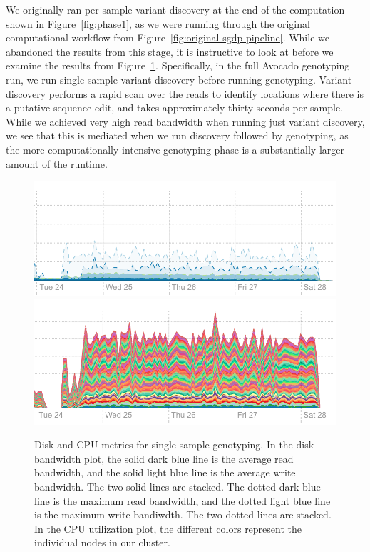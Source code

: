 \documentclass[phd]{ucbthesis}
\begin{document}
We originally ran per-sample variant discovery at the end of the computation
shown in Figure~\ref{fig:phase1}, as we were running through the original
computational workflow from Figure~\ref{fig:original-sgdp-pipeline}. While we
abandoned the results from this stage, it is instructive to look at before we
examine the results from Figure~\ref{fig:phase2}. Specifically, in the full
Avocado genotyping run, we run single-sample variant discovery before running
genotyping. Variant discovery performs a rapid scan over the reads to identify
locations where there is a putative sequence edit, and takes approximately
thirty seconds per sample. While we achieved very high read bandwidth when
running just variant discovery, we see that this is mediated when we run
discovery followed by genotyping, as the more computationally intensive
genotyping phase is a substantially larger amount of the runtime.

\begin{figure}[h]
  \begin{center}
    \includegraphics[width=0.95\linewidth]{graphs/phase2-disk.png}
    \includegraphics[width=0.95\linewidth]{graphs/phase2-cpu.png}
  \end{center}
  \caption{Disk and CPU metrics for single-sample genotyping.
    In the disk bandwidth plot, the
    solid dark blue line is the average read bandwidth, and the solid light blue
    line is the average write bandwidth. The two solid lines are stacked. The
    dotted dark blue line is the maximum read bandwidth, and the dotted light
    blue line is the maximum write bandiwdth. The two dotted lines are stacked.
    In the CPU utilization plot, the different colors represent the individual
    nodes in our cluster.}
  \label{fig:phase2}
\end{figure}
\end{document}
